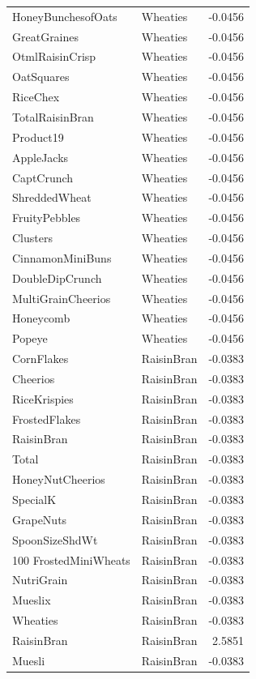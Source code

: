\begin{longtable}{llr}
HoneyBunchesofOats & Wheaties & -0.0456 \\
GreatGraines & Wheaties & -0.0456 \\
OtmlRaisinCrisp & Wheaties & -0.0456 \\
OatSquares & Wheaties & -0.0456 \\
RiceChex & Wheaties & -0.0456 \\
TotalRaisinBran & Wheaties & -0.0456 \\
Product19 & Wheaties & -0.0456 \\
AppleJacks & Wheaties & -0.0456 \\
CaptCrunch & Wheaties & -0.0456 \\
ShreddedWheat & Wheaties & -0.0456 \\
FruityPebbles & Wheaties & -0.0456 \\
Clusters & Wheaties & -0.0456 \\
CinnamonMiniBuns & Wheaties & -0.0456 \\
DoubleDipCrunch & Wheaties & -0.0456 \\
MultiGrainCheerios & Wheaties & -0.0456 \\
Honeycomb & Wheaties & -0.0456 \\
Popeye & Wheaties & -0.0456 \\
CornFlakes & RaisinBran & -0.0383 \\
Cheerios & RaisinBran & -0.0383 \\
RiceKrispies & RaisinBran & -0.0383 \\
FrostedFlakes & RaisinBran & -0.0383 \\
RaisinBran & RaisinBran & -0.0383 \\
Total & RaisinBran & -0.0383 \\
HoneyNutCheerios & RaisinBran & -0.0383 \\
SpecialK & RaisinBran & -0.0383 \\
GrapeNuts & RaisinBran & -0.0383 \\
SpoonSizeShdWt & RaisinBran & -0.0383 \\
100%
FrostedMiniWheats & RaisinBran & -0.0383 \\
NutriGrain & RaisinBran & -0.0383 \\
Mueslix & RaisinBran & -0.0383 \\
Wheaties & RaisinBran & -0.0383 \\
RaisinBran & RaisinBran & 2.5851 \\
Muesli & RaisinBran & -0.0383 \\

\end{longtable}
